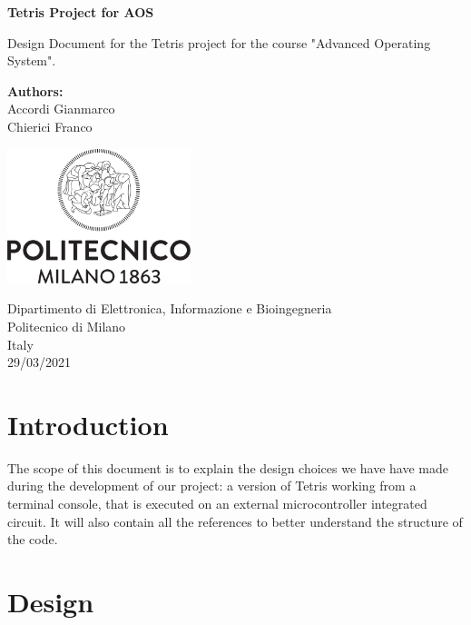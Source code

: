 \documentclass{article}
\begin{document}
\begin{titlepage}
    \begin{center}
       \vspace*{4cm}

       \textbf{\LARGE Tetris Project for AOS}

       \vspace{1.5cm}
        Design Document for the Tetris project for the course "Advanced Operating System".
            
       \vfill

       \textbf{Authors:}\\
       Accordi Gianmarco\\
       Chierici Franco

       \vspace{0.8cm}
     
       \includegraphics[width=0.4\textwidth]{img/Logo_Politecnico_Milano.png}
            
       Dipartimento di Elettronica, Informazione e Bioingegneria\\
       Politecnico di Milano\\
       Italy\\
       29/03/2021
            
   \end{center}
\end{titlepage}

\tableofcontents

\newpage

\section{Introduction}
The scope of this document is to explain the design choices we have have made during the development of our project: a version of Tetris working from a terminal console, that is executed on an external microcontroller integrated circuit. 
It will also contain all the references to better understand the structure of the code.

\section{Design}
\end{document}
